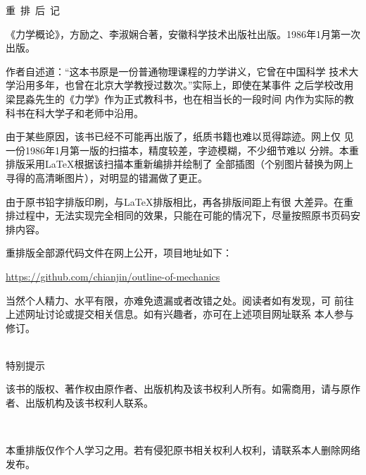\clearpage{\pagestyle{empty}\cleardoublepage}
\setcounter{page}{1}
\label{afterword}
\begin{center}
  \xbsong 重~排~后~记
\end{center}
\vspace{1em}



《力学概论》，方励之、李淑娴合著，安徽科学技术出版社出版。1986年1月第一次出版。

作者自述道：“这本书原是一份普通物理课程的力学讲义，它曾在中国科学
技术大学沿用多年，也曾在北京大学教授过数次。”实际上，即使在某事件
之后学校改用梁昆淼先生的《力学》作为正式教科书，也在相当长的一段时间
内作为实际的教科书在科大学子和老师中沿用。

由于某些原因，该书已经不可能再出版了，纸质书籍也难以觅得踪迹。网上仅
见一份1986年1月第一版的扫描本，精度较差，字迹模糊，不少细节难以
分辨。本重排版采用\LaTeX 根据该扫描本重新编排并绘制了
全部插图（个别图片替换为网上寻得的高清晰图片），对明显的错漏做了更正。

由于原书铅字排版印刷，与\LaTeX 排版相比，再各排版间距上有很
大差异。在重排过程中，无法实现完全相同的效果，只能在可能的情况下，尽量按照原书页码安排内容。

重排版全部源代码文件在网上公开，项目地址如下：
\begin{center}
    \href{https://github.com/chianjin/outline-of-mechanics}{https://github.com/chianjin/outline-of-mechanics}
\end{center}

当然个人精力、水平有限，亦难免遗漏或者改错之处。阅读者如有发现，可
前往上述网址讨论或提交相关信息。如有兴趣者，亦可在上述项目网址联系
本人参与修订。

\clearpage
\label{tips}
\heiti {}
\begin{center}
    ~\\
    特别提示
\end{center}
\normalsize
\vspace{1em}

该书的版权、著作权由原作者、出版机构及该书权利人所有。如需商用，请与原作者、出版机构及该书权利人联系。

~

本重排版仅作个人学习之用。若有侵犯原书相关权利人权利，请联系本人删除网络发布。

